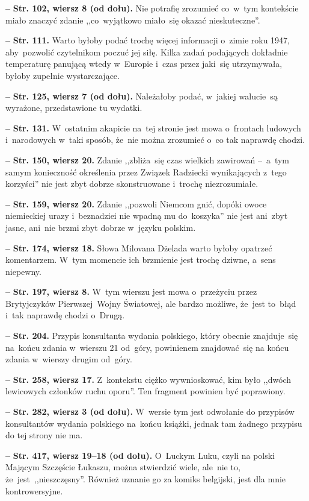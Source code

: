 \documentclass[a4paper,11pt]{article}
\newcommand{\tb}{\textbf}
\newcommand{\noi}{\noindent}
\newcommand{\start}{\noi \tb{--} {}}
\newcommand{\Str}[1]{\tb{Str. #1.}}
\newcommand{\StrWg}[2]{\tb{Str. #1, wiersz #2.}}
\newcommand{\StrWd}[2]{\tb{Str. #1, wiersz #2 (od dołu).}}
\begin{document}
\start \StrWd{102}{8} Nie potrafię zrozumieć co~w~tym kontekście miało
znaczyć zdanie ,,co~wyjątkowo miało~się okazać nieskuteczne''.

\start \Str{111} Warto byłoby podać trochę więcej informacji o~zimie
roku 1947, aby~pozwolić czytelnikom poczuć jej siłę. Kilka zadań
podających dokładnie temperaturę panującą wtedy w~Europie i~czas przez
jaki~się utrzymywała, byłoby zupełnie wystarczające.

\start \StrWd{125}{7} Należałoby podać, w~jakiej walucie~są wyrażone,
przedstawione tu wydatki.

\start \Str{131} W~ostatnim akapicie na~tej stronie jest mowa
o~frontach ludowych i~narodowych w~taki sposób, że~nie można zrozumieć
o~co tak naprawdę chodzi.

\start \StrWg{150}{20} Zdanie ,,zbliża~się czas wielkich zawirowań
--~a~tym samym konieczność określenia przez Związek Radziecki
wynikających z~tego korzyści'' nie jest zbyt dobrze skonstruowane
i~trochę niezrozumiałe.

\start \StrWg{159}{20} Zdanie ,,pozwoli Niemcom gnić, dopóki owoce
niemieckiej urazy i~beznadziei nie wpadną mu do~koszyka'' nie jest
ani~zbyt jasne, ani~nie brzmi zbyt dobrze w~języku polskim.

\start \StrWg{174}{18} Słowa Milovana Dżelada warto byłoby opatrzeć
komentarzem. W~tym momencie ich brzmienie jest trochę dziwne, a~sens
niepewny.

\start \StrWg{197}{8} W~tym wierszu jest mowa o~przeżyciu przez
Brytyjczyków Pierwszej~Wojny Światowej, ale bardzo możliwe, że~jest
to~błąd i~tak naprawdę chodzi o~Drugą.

\start \Str{204} Przypis konsultanta wydania polskiego, który obecnie
znajduje~się na~końcu zdania w~wierszu 21 od~góry, powinienem
znajdować~się na końcu zdania w~wierszy drugim od~góry.

\start \StrWg{258}{17} Z~kontekstu ciężko wywnioskować, kim było
,,dwóch lewicowych członków ruchu oporu''. Ten fragment powinien być
poprawiony.

\start \StrWd{282}{3} W~wersie tym jest odwołanie do przypisów
konsultantów wydania polskiego na~końcu książki, jednak tam żadnego
przypisu do tej strony nie ma.

\start \StrWd{417}{19--18} O~Luckym Luku, czyli na polski Mającym
Szczęście Łukaszu, można stwierdzić wiele, ale~nie to,
że~jest~,,nieszczęsny''. Również uznanie go za komiks belgijski, jest
dla mnie kontrowersyjne.
\end{document}
